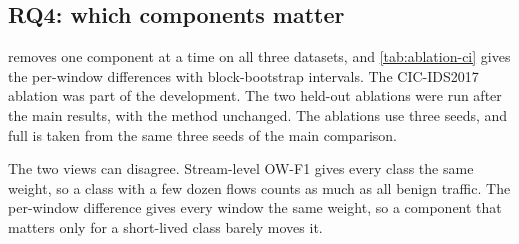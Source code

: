 \subsection{RQ4: which components matter}
\label{sec:res-ablation}
 removes one component at a time on all three datasets, and \cref{tab:ablation-ci} gives the
per-window differences with block-bootstrap intervals. The CIC-IDS2017 ablation was part of the development. The
two held-out ablations were run after the main results, with the method unchanged. The ablations use three seeds,
and full \nova{} is taken from the same three seeds of the main comparison.

The two views can disagree. Stream-level OW-F1 gives every class the same weight, so a class with a few dozen
flows counts as much as all benign traffic. The per-window difference gives every window the same weight, so a
component that matters only for a short-lived class barely moves it.

\begin{table}[t]
\centering
\caption{Ablation: stream-level OW macro-F1 (change against full \nova{} in points) and false-positive rate (\%)
with one component removed; budget 10\%, mean over three seeds. Full \nova{} is the mean over the same three seeds,
so it can differ slightly from \cref{tab:cic17,tab:ids18,tab:unsw}.}
\label{tab:ablation}
\small
\setlength{\tabcolsep}{4pt}
\end{table}

\begin{table}[t]
\centering
\caption{Ablation, per window: mean difference ablated minus full \nova{} over the 70 windows (points, both
averaged over the same three seeds), with 95\% moving-block bootstrap intervals. Negative OW-F1 and positive FPR
differences mean that the component helps.}
\label{tab:ablation-ci}
\small
\setlength{\tabcolsep}{4pt}
%
%
\end{table}

